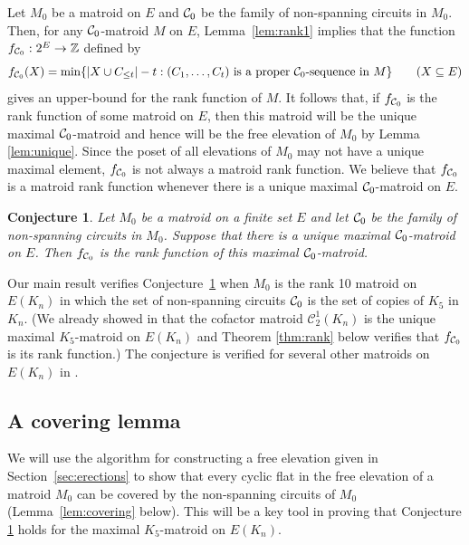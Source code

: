 \documentclass{daj}
\newtheorem{conjecture}[thm]{Conjecture}\theoremstyle{plain}
\begin{document}
Let $M_0$ be a matroid on $E$ and
${\cal C}_0$ be the family of non-spanning circuits in $M_0$.
Then, for any ${\cal C}_0$-matroid $M$ on $E$,  Lemma~\ref{lem:rank1} implies that the function $f_{{\cal C}_0}: 2^E\rightarrow \mathbb{Z}$ defined by
\[
f_{{\cal C}_0}(X)=\min\{|X\cup C_{\leq t}|-t : \text{$(C_1,\dots, C_t)$ is a proper ${\cal C}_0$-sequence in $M$}\} \qquad (X\subseteq E)
\]
gives an upper-bound for the rank function of $M$.
 It follows that, if $f_{{\cal C}_0}$ is the rank function of some matroid on $E$,
 then this  matroid will be the unique maximal ${\cal C}_0$-matroid and hence will be the free elevation of $M_0$  by Lemma \ref{lem:unique}.
Since the poset of all elevations of $M_0$ may not have a unique maximal element,
%
$f_{{\cal C}_0}$ is not always a matroid rank function.
We believe that $f_{{\cal C}_0}$ is  a matroid rank function  whenever
there is a unique maximal ${\cal C}_0$-matroid on $E$.

\begin{conjecture}\label{conj:rank}
Let $M_0$ be a matroid on a finite set $E$ and let ${\cal C}_0$ be the family of non-spanning circuits in $M_0$.
Suppose that there is a unique maximal ${\cal C}_0$-matroid on $E$.
Then $f_{{\cal C}_0}$ is the rank function of this maximal ${\cal C}_0$-matroid.
\end{conjecture}
Our main result verifies Conjecture~\ref{conj:rank} when $M_0$ is the rank 10 matroid on $E(K_n)$ in which the set of  non-spanning  circuits ${\cal C}_0$ is the set of copies of $K_5$ in $K_n$. (We already showed in \cite{CJT1} that the cofactor matroid $\mathcal{C}^1_2(K_n)$ is the  
unique maximal $K_5$-matroid 
on $E(K_n)$ and Theorem \ref{thm:rank} below verifies that  $f_{{\cal C}_0}$ is its rank function.) The conjecture is verified for several other matroids on $E(K_n)$ in \cite{JT}. 


\subsection{A covering lemma}
We will use the algorithm for constructing a free elevation  given in Section~\ref{sec:erections} to show that every cyclic flat in the free elevation of a matroid $M_0$ can be covered by the non-spanning circuits of $M_0$ (Lemma~\ref{lem:covering} below). This will be a key tool in proving that Conjecture \ref{conj:rank} holds for the maximal $K_5$-matroid on $E(K_n)$. 
\end{document}
